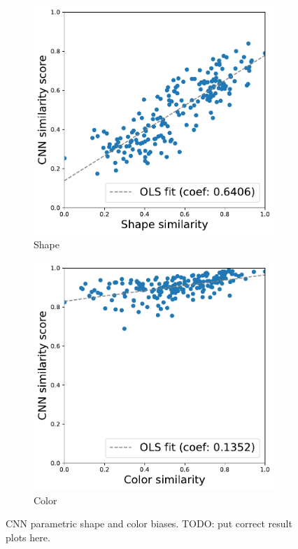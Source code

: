 \begin{figure}[h!]
    \begin{center}
        \begin{subfigure}[b]{0.235\textwidth}
            \includegraphics[width=\linewidth]
            {figures/vgg_shape_parametric_others_constant.pdf}
            \caption{Shape}
        \end{subfigure}
        \begin{subfigure}[b]{0.235\textwidth}
            \includegraphics[width=\linewidth]
            {figures/vgg_color_parametric_others_constant.pdf}
            \caption{Color}
        \end{subfigure}
    \end{center}
    \caption{CNN parametric shape and color biases. TODO: put correct result
    plots here.}
    \label{fig:cnn_parametric}
\end{figure}

